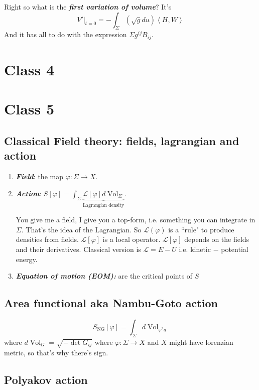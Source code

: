 Right so what is the \textit{\textbf{first variation of volume}}? It's
\[V'|_{t=0}=-\int_\Sigma(\sqrt{g} du) \left<H,W\right>\]
And it has all to do with the expression \(\Sigma g^{ij}B_{ij}\).

\section{Class 4}

\section{Class 5}

\subsection{Classical Field theory: fields, lagrangian and action}

\begin{enumerate}
\item \textit{\textbf{Field}}: the map \(\varphi:\Sigma \to X\).
\item \textit{\textbf{Action}}: \(S[\varphi]=\int_\Sigma \underbrace{\mathcal{L}[\varphi]d \operatorname{Vol}_\Sigma}_{\text{Lagrangian density} }\).

	You give me a field, I give you a top-form, i.e. something you can integrate in \(\Sigma\). That's the idea of the Lagrangian. So \(\mathcal{L}(\varphi)\) is a ``rule" to produce densities from fields. \(\mathcal{L}[\varphi]\) is a local operator. \(\mathcal{L}[\varphi]\) depends on the fields and their derivatives. Classical version is \(\mathcal{L}=E - U\) i.e. kinetic \(-\) potential energy.
\item \textit{\textbf{Equation of motion (EOM):}} are the critical points of \(S\)
\end{enumerate}

\subsection{Area functional aka Nambu-Goto action}

\[S_{\operatorname{ NG}}[\varphi]=\int_{\Sigma}d\operatorname{Vol}_{\varphi^*g}\]
where \(d\operatorname{Vol}_G=\sqrt{- \det G_{ij}}\) where \(\varphi: \Sigma \to X\) and \(X\) might have lorenzian metric, so that's why there's  sign.

\subsection{Polyakov action}


